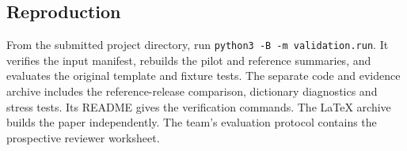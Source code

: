 \documentclass[11pt,a4paper,onecolumn,oneside]{rho-class/rho}
\begin{document}
\subsection{Reproduction}

From the submitted project directory, run \texttt{python3 -B -m validation.run}. It verifies the input manifest, rebuilds the pilot and reference summaries, and evaluates the original template and fixture tests. The separate code and evidence archive includes the reference-release comparison, dictionary diagnostics and stress tests. Its README gives the verification commands. The LaTeX archive builds the paper independently. The team's evaluation protocol contains the prospective reviewer worksheet.

\clearpage

\clearpage

\end{document}
